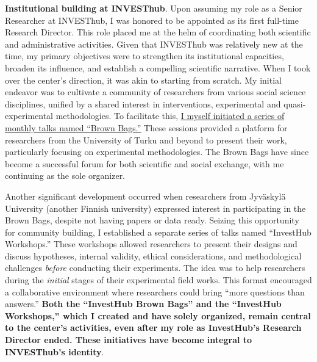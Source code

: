 \documentclass[10pt,stdletter,dateno,sigleft]{newlfm} %
\begin{document}
\begin{newlfm}
{\bf Institutional building at INVESThub}. Upon assuming my role as a Senior Researcher at INVESThub, I was honored to be appointed as its first full-time Research Director. This role placed me at the helm of coordinating both scientific and administrative activities. Given that INVESThub was relatively new at the time, my primary objectives were to strengthen its institutional capacities, broaden its influence, and establish a compelling scientific narrative. When I took over the center's direction, it was akin to starting from scratch. My initial endeavor was to cultivate a community of researchers from various social science disciplines, unified by a shared interest in interventions, experimental and quasi-experimental methodologies. To facilitate this, \href{https://invest.utu.fi/news/investhub-brings-together-social-scientists-interested-in-experimental-research/}{I myself initiated a series of monthly talks named ``Brown Bags.''} These sessions provided a platform for researchers from the University of Turku and beyond to present their work, particularly focusing on experimental methodologies. The Brown Bags have since become a successful forum for both scientific and social exchange, with me continuing as the sole organizer. 

Another significant development occurred when researchers from Jyväskylä University (another Finnish university) expressed interest in participating in the Brown Bags, despite not having papers or data ready. Seizing this opportunity for community building, I established a separate series of talks named ``InvestHub Workshops.'' These workshops allowed researchers to present their designs and discuss hypotheses, internal validity, ethical considerations, and methodological challenges \emph{before} conducting their experiments. The idea was to help researchers during the \emph{initial} stages of their experimental field works. This format encouraged a collaborative environment where researchers could bring ``more questions than answers.'' {\bf Both the ``InvestHub Brown Bags'' and the ``InvestHub Workshops,'' which I created and have solely organized, remain central to the center's activities, even after my role as InvestHub's Research Director ended. These initiatives have become integral to INVESThub's identity}.


\end{newlfm}
\end{document}
